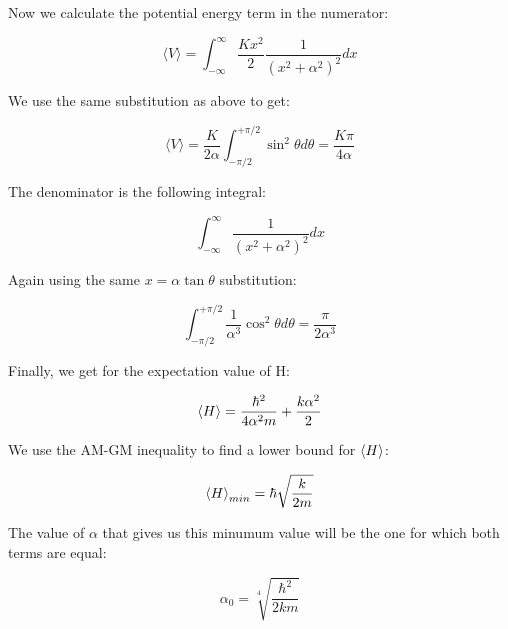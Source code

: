 Now we calculate the potential energy term in the numerator:

\begin{equation}
    \langle V \rangle = \int_{-\infty}^{\infty}   \frac{K x^2}{2} \frac{1}{(x^2 + \alpha^2)^2} dx 
\end{equation}

We use the same substitution as above to get:

\begin{equation}
     \langle V \rangle = \frac{K}{2 \alpha}  \int_{-\pi/2}^{+\pi/2} \sin^2 \theta d \theta = \frac{K \pi}{4 \alpha} 
\end{equation}

The denominator is the following integral:

\begin{equation}
\int_{-\infty}^{\infty}  \frac{1}{(x^2 + \alpha^2)^2} dx
\end{equation}

Again using the same $x = \alpha \tan \theta$ substitution: 

\begin{equation}
\int_{-\pi/2}^{+\pi/2}  \frac{1}{\alpha^3} \cos^2 \theta d \theta= \frac{\pi}{2 \alpha^3} 
\end{equation}
 
 Finally, we get for the expectation value of H:
 
 \begin{equation}
     \expectationvalue{H} = \frac{\hbar^2}{4 \alpha^2 m} + \frac{k \alpha^2}{2}
 \end{equation}
 
 We use the AM-GM inequality to find a lower bound for $\expectationvalue{H}$:
 
 \begin{equation}
     \expectationvalue{H}_{min} = \hbar \sqrt{\frac{k}{2m}}
 \end{equation}
 
 The value of $\alpha$ that gives us this minumum value will be the one for which both terms are equal:
 
 \begin{equation}
     \alpha_0 = \sqrt[4]{\frac{\hbar^2}{2 k m}}
 \end{equation}
 
